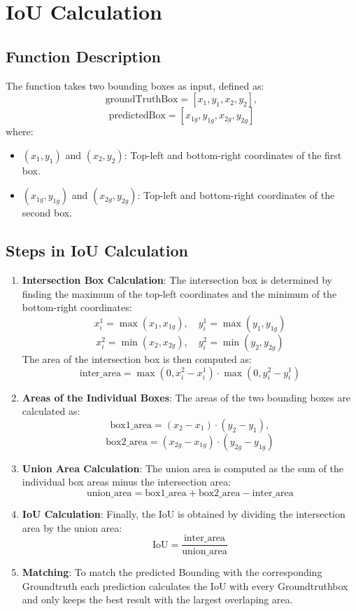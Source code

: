 \documentclass[a4paper,twocolumn]{article}
\begin{document}
\section{\ac{IoU} Calculation}

\subsection{Function Description}
The function takes two bounding boxes as input, defined as:
\[
\text{groundTruthBox} = [x_1, y_1, x_2, y_2], 
\]
\[
\text{predictedBox} = [x_{1g}, y_{1g}, x_{2g}, y_{2g}]
\]
where:
\begin{itemize}
    \item \((x_1, y_1)\) and \((x_2, y_2)\): Top-left and bottom-right coordinates of the first box.
    \item \((x_{1g}, y_{1g})\) and \((x_{2g}, y_{2g})\): Top-left and bottom-right coordinates of the second box.
\end{itemize}

\subsection{Steps in IoU Calculation}

\begin{enumerate}
    \item \textbf{Intersection Box Calculation}: 
    The intersection box is determined by finding the maximum of the top-left coordinates and the minimum of the bottom-right coordinates:
    \[
    x_i^1 = \max(x_1, x_{1g}), \quad y_i^1 = \max(y_1, y_{1g})
    \]
    \[
    x_i^2 = \min(x_2, x_{2g}), \quad y_i^2 = \min(y_2, y_{2g})
    \]
    The area of the intersection box is then computed as:
    \[
    \text{inter\_area} = \max(0, x_i^2 - x_i^1) \cdot \max(0, y_i^2 - y_i^1)
    \]

    \item \textbf{Areas of the Individual Boxes}: 
    The areas of the two bounding boxes are calculated as:
    \[
    \text{box1\_area} = (x_2 - x_1) \cdot (y_2 - y_1), 
    \]\[
    \text{box2\_area} = (x_{2g} - x_{1g}) \cdot (y_{2g} - y_{1g})
    \]

    \item \textbf{Union Area Calculation}:
    The union area is computed as the sum of the individual box areas minus the intersection area:
    \[
    \text{union\_area} = \text{box1\_area} + \text{box2\_area} - \text{inter\_area}
    \]

    \item \textbf{IoU Calculation}:
    Finally, the IoU is obtained by dividing the intersection area by the union area:
    \[
    \text{IoU} = \frac{\text{inter\_area}}{\text{union\_area}}
    \]

    \item \textbf{Matching}:
    To match the predicted Bounding with the corresponding Groundtruth each prediction calculates the IoU with every Groundtruthbox and only keeps the best result with the largest overlaping area.

\end{enumerate}
\end{document}
